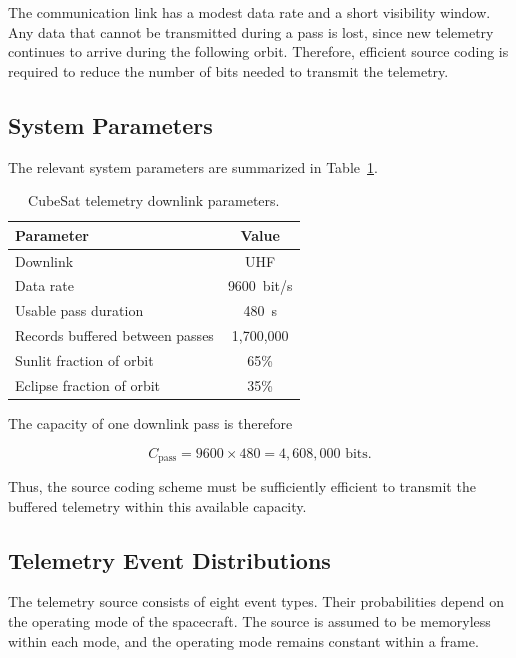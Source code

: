 \documentclass[11pt,a4paper]{article}
\begin{document}
The communication link has a modest data rate and a short visibility
window. Any data that cannot be transmitted during a pass is lost,
since new telemetry continues to arrive during the following orbit.
Therefore, efficient source coding is required to reduce the number of
bits needed to transmit the telemetry.

\subsection{System Parameters}

The relevant system parameters are summarized in Table~\ref{tab:parameters}.

\begin{table}[H]
    \centering
    \caption{CubeSat telemetry downlink parameters.}
    \label{tab:parameters}
    \begin{tabular}{lc}
        \toprule
        \textbf{Parameter} & \textbf{Value} \\
        \midrule
        Downlink & UHF \\
        Data rate & \SI{9600}{bit/s} \\
        Usable pass duration & \SI{480}{s} \\
        Records buffered between passes & 1,700,000 \\
        Sunlit fraction of orbit & 65\% \\
        Eclipse fraction of orbit & 35\% \\
        \bottomrule
    \end{tabular}
\end{table}

The capacity of one downlink pass is therefore

\begin{equation}
    C_{\mathrm{pass}}
    = 9600 \times 480
    = 4{,}608{,}000 \text{ bits}.
\end{equation}

Thus, the source coding scheme must be sufficiently efficient to
transmit the buffered telemetry within this available capacity.

\subsection{Telemetry Event Distributions}

The telemetry source consists of eight event types. Their probabilities
depend on the operating mode of the spacecraft. The source is assumed
to be memoryless within each mode, and the operating mode remains
constant within a frame.
\end{document}
